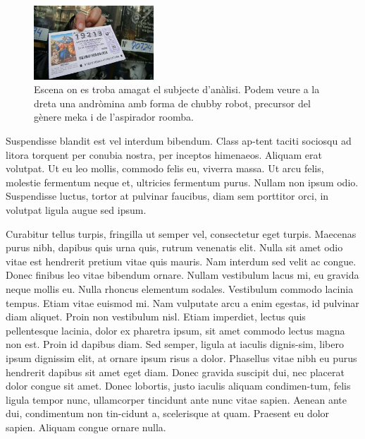 ﻿\documentclass[10pt,a4paper,twocolumn,twoside]{article}
\begin{document}
\begin{figure}[!h]
\centering
	\includegraphics[width=0.4\textwidth]{figs/Fig1.jpg}
	\caption{Escena on es troba amagat el subjecte d’anàlisi. Podem veure a la dreta una andròmina amb forma de chubby robot, precursor del gènere meka i de l’aspirador roomba.}
	\label{f:vistageneral}
\end{figure}

Suspendisse blandit est vel interdum bibendum. Class ap-tent taciti sociosqu ad litora torquent per conubia nostra, per inceptos himenaeos. Aliquam erat volutpat. Ut eu leo mollis, commodo felis eu, viverra massa. Ut arcu felis, molestie fermentum neque et, ultricies fermentum purus. Nullam non ipsum odio. Suspendisse luctus, tortor at pulvinar faucibus, diam sem porttitor orci, in volutpat ligula augue sed ipsum.


Curabitur tellus turpis, fringilla ut semper vel, consectetur eget turpis. Maecenas purus nibh, dapibus quis urna quis, rutrum venenatis elit. Nulla sit amet odio vitae est hendrerit pretium vitae quis mauris. Nam interdum sed velit ac congue. Donec finibus leo vitae bibendum ornare. Nullam vestibulum lacus mi, eu gravida neque mollis eu. Nulla rhoncus elementum sodales. Vestibulum commodo lacinia tempus. Etiam vitae euismod mi. Nam vulputate arcu a enim egestas, id pulvinar diam aliquet. Proin non vestibulum nisl. Etiam imperdiet, lectus quis pellentesque lacinia, dolor ex pharetra ipsum, sit amet commodo lectus magna non est. Proin id dapibus diam. Sed semper, ligula at iaculis dignis-sim, libero ipsum dignissim elit, at ornare ipsum risus a dolor. Phasellus vitae nibh eu purus hendrerit dapibus sit amet eget diam. Donec gravida suscipit dui, nec placerat dolor congue sit amet. Donec lobortis, justo iaculis aliquam condimen-tum, felis ligula tempor nunc, ullamcorper tincidunt ante nunc vitae sapien. Aenean ante dui, condimentum non tin-cidunt a, scelerisque at quam. Praesent eu dolor sapien. Aliquam congue ornare nulla. 
\end{document}
